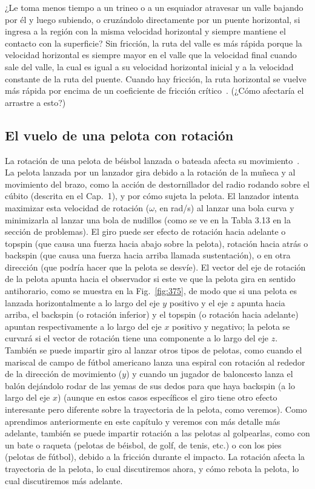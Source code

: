 \documentclass[12pt]{book}
\begin{document}
¿Le toma menos tiempo a un trineo o a un esquiador atravesar un valle bajando por él y luego subiendo, o cruzándolo directamente por un puente horizontal, si ingresa a la región con la misma velocidad horizontal y siempre mantiene el contacto con la superficie? Sin fricción, la ruta del valle es más rápida porque la velocidad horizontal es siempre mayor en el valle que la velocidad final cuando sale del valle, la cual es igual a su velocidad horizontal inicial y a la velocidad constante de la ruta del puente. Cuando hay fricción, la ruta horizontal se vuelve más rápida por encima de un coeficiente de fricción crítico~\cite{ref73}. (¿Cómo afectaría el arrastre a esto?)

\subsection{El vuelo de una pelota con rotación}

La rotación de una pelota de béisbol lanzada o bateada afecta su movimiento~\cite{ref16,ref36,ref60,ref108}. La pelota lanzada por un lanzador gira debido a la rotación de la muñeca y al movimiento del brazo, como la acción de destornillador del radio rodando sobre el cúbito (descrita en el Cap.~1), y por cómo sujeta la pelota. El lanzador intenta maximizar esta velocidad de rotación ($\omega$, en rad/s) al lanzar una bola curva y minimizarla al lanzar una bola de nudillos (como se ve en la Tabla 3.13 en la sección de problemas). El giro puede ser efecto de rotación hacia adelante o topspin (que causa una fuerza hacia abajo sobre la pelota), rotación hacia atrás o backspin (que causa una fuerza hacia arriba llamada sustentación), o en otra dirección (que podría hacer que la pelota se desvíe). El vector del eje de rotación de la pelota apunta hacia el observador si este ve que la pelota gira en sentido antihorario, como se muestra en la Fig.~\ref{fig:375}, de modo que si una pelota es lanzada horizontalmente a lo largo del eje $y$ positivo y el eje $z$ apunta hacia arriba, el backspin (o rotación inferior) y el topspin (o rotación hacia adelante) apuntan respectivamente a lo largo del eje $x$ positivo y negativo; la pelota se curvará si el vector de rotación tiene una componente a lo largo del eje $z$. También se puede impartir giro al lanzar otros tipos de pelotas, como cuando el mariscal de campo de fútbol americano lanza una espiral con rotación al rededor de la dirección de movimiento ($y$) y cuando un jugador de baloncesto lanza el balón dejándolo rodar de las yemas de sus dedos para que haya backspin (a lo largo del eje $x$) (aunque en estos casos específicos el giro tiene otro efecto interesante pero diferente sobre la trayectoria de la pelota, como veremos). Como aprendimos anteriormente en este capítulo y veremos con más detalle más adelante, también se puede impartir rotación a las pelotas al golpearlas, como con un bate o raqueta (pelotas de béisbol, de golf, de tenis, etc.) o con los pies (pelotas de fútbol), debido a la fricción durante el impacto. La rotación afecta la trayectoria de la pelota, lo cual discutiremos ahora, y cómo rebota la pelota, lo cual discutiremos más adelante.
\end{document}
